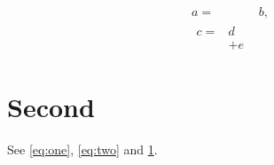 \documentclass{article}
\begin{document}
\begin{align}
\label{eq:one}
a ={}& b, \\
\begin{split}
\label{eq:two}
c ={}& d
\\
& + e
\end{split}
\end{align}
\section{Second}\label{sec:b}
See \cref{eq:one}, \eqref{eq:two} and \cref{sec:b}.
\end{document}
